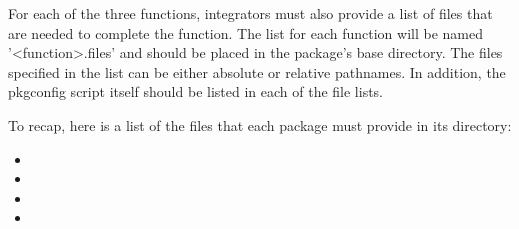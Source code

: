 For each of the three functions, integrators must also provide a list
of files that are needed to complete the function. The list for each
function will be named '<function>.files' and should be placed in the
package's base directory. The files specified in the list can be
either absolute or relative pathnames. In addition, the pkgconfig
script itself should be listed in each of the file lists.

To recap, here is a list of the files that each package must provide
in its directory:

\begin{itemize}
\item {}
\item {}
\item {}
\item {}
\end{itemize}
